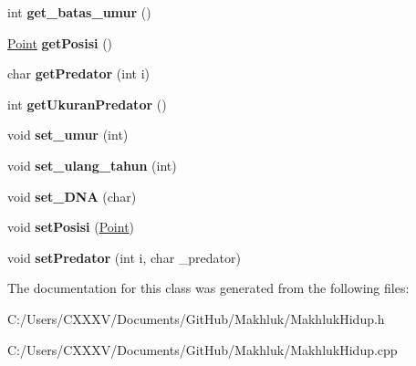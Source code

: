 \begin{DoxyCompactItemize}
\item 
int {\bfseries get\+\_\+batas\+\_\+umur} ()\hypertarget{class_makhluk_hidup_a78cd2c91aba52d11f2e7606b52a706d4}{}\label{class_makhluk_hidup_a78cd2c91aba52d11f2e7606b52a706d4}

\item 
\hyperlink{class_point}{Point} {\bfseries get\+Posisi} ()\hypertarget{class_makhluk_hidup_a555874bb0b80f95157a7e2746ea36f35}{}\label{class_makhluk_hidup_a555874bb0b80f95157a7e2746ea36f35}

\item 
char {\bfseries get\+Predator} (int i)\hypertarget{class_makhluk_hidup_a97bc5cca37bfa18311e99ce63e39a009}{}\label{class_makhluk_hidup_a97bc5cca37bfa18311e99ce63e39a009}

\item 
int {\bfseries get\+Ukuran\+Predator} ()\hypertarget{class_makhluk_hidup_ad12076a7c63dde29e90b1f4ca48aaff1}{}\label{class_makhluk_hidup_ad12076a7c63dde29e90b1f4ca48aaff1}

\item 
void {\bfseries set\+\_\+umur} (int)\hypertarget{class_makhluk_hidup_adc7715c1915723fdf42ff205458923e7}{}\label{class_makhluk_hidup_adc7715c1915723fdf42ff205458923e7}

\item 
void {\bfseries set\+\_\+ulang\+\_\+tahun} (int)\hypertarget{class_makhluk_hidup_a9db02ead4d61096dbd8f7a9e26901e71}{}\label{class_makhluk_hidup_a9db02ead4d61096dbd8f7a9e26901e71}

\item 
void {\bfseries set\+\_\+\+D\+NA} (char)\hypertarget{class_makhluk_hidup_a816be4a8a08a2daccab170b99fb26ce9}{}\label{class_makhluk_hidup_a816be4a8a08a2daccab170b99fb26ce9}

\item 
void {\bfseries set\+Posisi} (\hyperlink{class_point}{Point})\hypertarget{class_makhluk_hidup_a62cb644f5defd2cc68783f52ef954b57}{}\label{class_makhluk_hidup_a62cb644f5defd2cc68783f52ef954b57}

\item 
void {\bfseries set\+Predator} (int i, char \+\_\+predator)\hypertarget{class_makhluk_hidup_add4f38ec95f2c1e5b715a7184105288a}{}\label{class_makhluk_hidup_add4f38ec95f2c1e5b715a7184105288a}

\end{DoxyCompactItemize}


The documentation for this class was generated from the following files\+:\begin{DoxyCompactItemize}
\item 
C\+:/\+Users/\+C\+X\+X\+X\+V/\+Documents/\+Git\+Hub/\+Makhluk/Makhluk\+Hidup.\+h\item 
C\+:/\+Users/\+C\+X\+X\+X\+V/\+Documents/\+Git\+Hub/\+Makhluk/Makhluk\+Hidup.\+cpp\end{DoxyCompactItemize}
